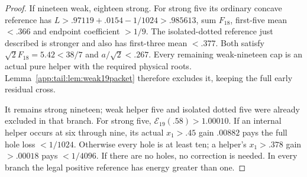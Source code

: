\begin{proof}
If nineteen weak, eighteen strong. For strong five its ordinary
concave reference has $L>.97119+.0154-1/1024>.985613$,
sum $F_{18}$, first-five mean $<.366$ and endpoint coefficient
$>1/9$. The isolated-dotted reference just described is stronger
and also has first-three mean $<.377$. Both satisfy
$\sqrt2F_{18}=5.42<38/7$ and $a/\sqrt2<.267$.
Every remaining weak-nineteen cap is an actual pure helper with
the required physical roots. Lemma~\ref{app:tail:lem:weak19packet}
therefore excludes it, keeping the full early residual cross.

It remains strong nineteen; weak helper five and isolated dotted
five were already excluded in that branch. For strong five,
$\mathcal E_{19}(.58)>1.00010$. If an internal helper occurs
at six through nine, its actual $x_1>.45$ gain $.00882$ pays
the full hole loss $<1/1024$. Otherwise every hole is at least
ten; a helper's $x_1>.378$ gain $>.00018$ pays $<1/4096$.
If there are no holes, no correction is needed. In every branch
the legal positive reference has energy greater than one.
\end{proof}

